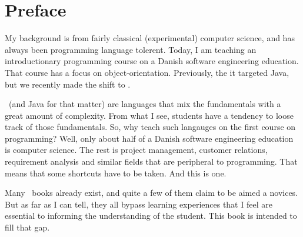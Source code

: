 \chapter*{Preface}

My background is from fairly classical (experimental) computer science, and has always been programming language tolerent. Today, I am teaching an introductionary programming course on a Danish software engineering education. That course has a focus on object-orientation. Previously, the it targeted Java, but we recently made the shift to \csharp.

\csharp\ (and Java for that matter) are languages that mix the fundamentals with a great amount of complexity. From what I see, students have a tendency to loose track of those fundamentals. So, why teach such langauges on the first course on programming? Well, only about half of a Danish software engineering education is computer science. The rest is project management, customer relations, requirement analysis and similar fields that are peripheral to programming. That means that some shortcuts have to be taken. And this is one.

Many \csharp\ books already exist, and quite a few of them claim to be aimed a novices. But as far as I can tell, they all bypass learning experiences that I feel are essential to informing the understanding of the student. This book is intended to fill that gap.

